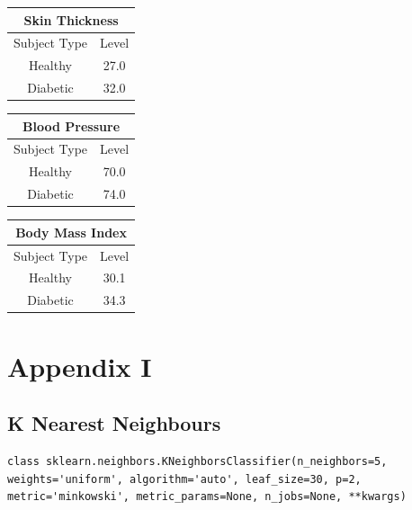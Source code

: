 \documentclass[12pt]{article}
\begin{document}
\begin{table}[]
\centering
\begin{tabular}{|c|c|}
\hline
\multicolumn{2}{|c|}{Skin Thickness} \\ \hline
Subject Type      & Level     \\ \hline
Healthy           & 27.0     \\ \hline
Diabetic          & 32.0     \\ \hline
\end{tabular}
\label{table:10}
\end{table}



\begin{table}[]
\centering
\begin{tabular}{|c|c|}
\hline
\multicolumn{2}{|c|}{Blood Pressure} \\ \hline
Subject Type      & Level     \\ \hline
Healthy           & 70.0    \\ \hline
Diabetic          & 74.0     \\ \hline
\end{tabular}
\label{table:11}
\end{table}


\begin{table}[]
\centering
\begin{tabular}{|c|c|}
\hline
\multicolumn{2}{|c|}{Body Mass Index} \\ \hline
Subject Type      & Level     \\ \hline
Healthy           & 30.1      \\ \hline
Diabetic          & 34.3      \\ \hline
\end{tabular}
\label{table:12}
\end{table}










\newpage
\clearpage

\section{Appendix I}
\subsection{K Nearest Neighbours}
\begin{lstlisting}
class sklearn.neighbors.KNeighborsClassifier(n_neighbors=5, weights='uniform', algorithm='auto', leaf_size=30, p=2, metric='minkowski', metric_params=None, n_jobs=None, **kwargs)
\end{lstlisting}
\end{document}

